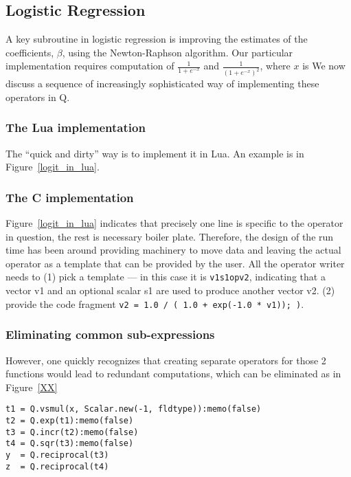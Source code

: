 \subsection{Logistic Regression}

A key subroutine in logistic regression \cite{XXX} is improving the 
estimates of the
coefficients, \(\beta\), using the Newton-Raphson algorithm.
Our particular implementation requires computation of 
\(\frac{1}{1 + e^{-x}}\) and 
\(\frac{1}{(1 + e^{-x})^2}\), where \(x\) is \TBC 
We now discuss a sequence of increasingly sophisticated way of implementing
these operators in Q.

\subsubsection{The Lua implementation}
The ``quick and dirty'' way is to implement it in Lua. An example is 
in Figure~\ref{logit_in_lua}.
\begin{figure}
\centering
{}
\end{figure}

\subsubsection{The C implementation}
Figure~\ref{logit_in_lua} indicates that precisely one line is specific to the
operator in question, the rest is necessary boiler plate. Therefore, the design
of the run time has been around providing machinery to move data and leaving
the actual operator as a template that can be provided by the user. All the operator
writer needs to (1) pick a template --- in this case it is {\tt v1s1opv2}, indicating that a
vector v1 and an optional scalar s1 are used to produce another vector v2.
(2) provide the code fragment {\tt  v2 = 1.0 / ( 1.0 + exp(-1.0 * v1)); )}.

\subsubsection{Eliminating common sub-expressions}
However, one quickly recognizes that creating separate operators for those 2
functions would lead to 
redundant computations, which can be eliminated as in Figure~\ref{XX}
\begin{verbatim}
t1 = Q.vsmul(x, Scalar.new(-1, fldtype)):memo(false)
t2 = Q.exp(t1):memo(false)
t3 = Q.incr(t2):memo(false)
t4 = Q.sqr(t3):memo(false)
y  = Q.reciprocal(t3)
z  = Q.reciprocal(t4)
\end{verbatim}


